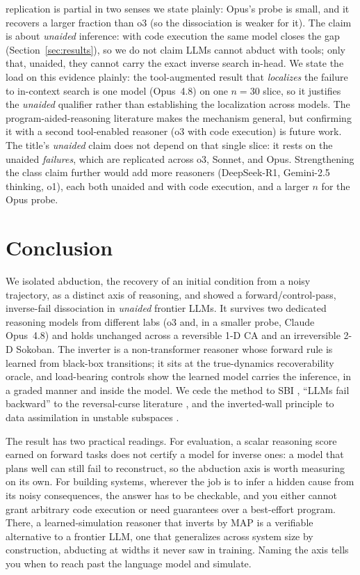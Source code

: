 \documentclass{article}
\begin{document}
replication is partial in two senses we state plainly: Opus's probe is small, and it recovers a larger
fraction than o3 (so the dissociation is weaker for it). The claim is about \emph{unaided} inference:
with code execution the same model closes the gap (Section~\ref{sec:results}), so we do not claim LLMs
cannot abduct with tools; only that, unaided, they cannot carry the exact inverse search in-head. We
state the load on this evidence plainly: the tool-augmented result that \emph{localizes} the failure
to in-context search is one model (Opus~4.8) on one $n=30$ slice, so it justifies the \emph{unaided}
qualifier rather than establishing the localization across models. The program-aided-reasoning
literature \cite{pal, pot} makes the mechanism general, but confirming it with a second tool-enabled
reasoner (o3 with code execution) is future work. The title's \emph{unaided} claim does not depend on
that single slice: it rests on the unaided \emph{failures}, which are replicated across o3, Sonnet, and
Opus. Strengthening the class claim further would add more reasoners (DeepSeek-R1, Gemini-2.5 thinking,
o1), each both unaided and with code execution, and a larger $n$ for the Opus probe.

\section{Conclusion}
\label{sec:conclusion}

We isolated abduction, the recovery of an initial condition from a noisy trajectory, as a distinct
axis of reasoning, and showed a forward/control-pass, inverse-fail dissociation in \emph{unaided}
frontier LLMs. It survives two dedicated reasoning models from
different labs (o3 and, in a smaller probe,
Claude Opus~4.8) and holds unchanged across a reversible 1-D CA and an irreversible 2-D Sokoban. The inverter is a non-transformer reasoner whose forward rule is learned
from black-box transitions; it sits at the true-dynamics recoverability oracle, and load-bearing
controls show the learned model carries the inference, in a graded manner and inside the model. We
cede the method to SBI \cite{sbi2020}, ``LLMs fail backward'' to the reversal-curse literature
\cite{reversalcurse}, and the inverted-wall principle to data assimilation in unstable subspaces
\cite{carrassi}.

The result has two practical readings. For evaluation, a scalar reasoning score earned on forward
tasks does not certify a model for inverse ones: a model that plans well can still fail to
reconstruct, so the abduction axis is worth measuring on its own. For building systems, wherever the
job is to infer a hidden cause from its noisy consequences, the answer has to be checkable, and you
either cannot grant arbitrary code execution or need guarantees over a best-effort program. There, a
learned-simulation reasoner that inverts by MAP is a verifiable alternative to a frontier LLM, one that
generalizes across system size by construction, abducting at widths it never saw in training. Naming the
axis tells you when to reach past the language model and simulate.
\end{document}
